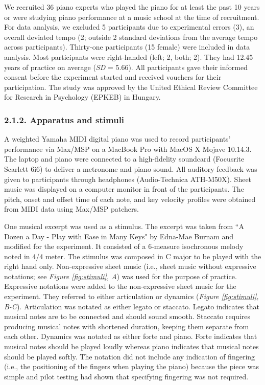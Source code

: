 \documentclass[
  english,
  man,floatsintext]{apa6}
\begin{document}
We recruited 36 piano experts who played the piano for at least the past 10 years or were studying piano performance at a music school at the time of recruitment. For data analysis, we excluded 5 participants due to experimental errors (3), an overall deviated tempo (2; outside 2 standard deviations from the average tempo across participants). Thirty-one participants (15 female) were included in data analysis. Most participants were right-handed (left; 2, both; 2). They had 12.45 years of practice on average (\emph{SD} = 5.66). All participants gave their informed consent before the experiment started and received vouchers for their participation. The study was approved by the United Ethical Review Committee for Research in Psychology (EPKEB) in Hungary.

\hypertarget{apparatus-and-stimuli}{%
\subsubsection{2.1.2. Apparatus and stimuli}\label{apparatus-and-stimuli}}

A weighted Yamaha MIDI digital piano was used to record participants' performance via Max/MSP on a MacBook Pro with MacOS X Mojave 10.14.3. The laptop and piano were connected to a high-fidelity soundcard (Focusrite Scarlett 6i6) to deliver a metronome and piano sound. All auditory feedback was given to participants through headphones (Audio-Technica ATH-M50X). Sheet music was displayed on a computer monitor in front of the participants. The pitch, onset and offset time of each note, and key velocity profiles were obtained from MIDI data using Max/MSP patchers.

One musical excerpt was used as a stimulus. The excerpt was taken from ``A Dozen a Day - Play with Ease in Many Keys" by Edna-Mae Burnam and modified for the experiment. It consisted of a 6-measure isochronous melody noted in 4/4 meter. The stimulus was composed in C major to be played with the right hand only. Non-expressive sheet music (i.e., sheet music without expressive notations; see \emph{Figure \ref{fig:stimuli}, A}) was used for the purpose of practice. Expressive notations were added to the non-expressive sheet music for the experiment. They referred to either articulation or dynamics (\emph{Figure \ref{fig:stimuli}, B-C}). Articulation was notated as either legato or staccato. Legato indicates that musical notes are to be connected and should sound smooth. Staccato requires producing musical notes with shortened duration, keeping them separate from each other. Dynamics was notated as either forte and piano. Forte indicates that musical notes should be played loudly whereas piano indicates that musical notes should be played softly. The notation did not include any indication of fingering (i.e., the positioning of the fingers when playing the piano) because the piece was simple and pilot testing had shown that specifying fingering was not required.
\end{document}

